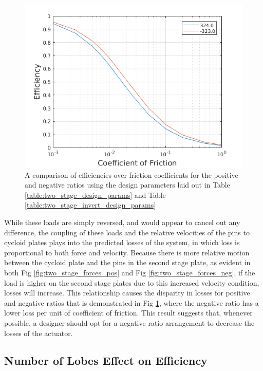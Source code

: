\begin{figure}[h]
	\centering
	\includegraphics[width=0.75\linewidth]{fig/two_stage_pos_neg}
   \caption{A comparison of efficiencies over friction coefficients for the positive and negative ratios using the design parameters laid out in Table \ref{table:two_stage_design_params} and Table \ref{table:two_stage_invert_design_params}}
   \label{fig:two_stage_pos_neg}
\end{figure}

While these loads are simply reversed, and would appear to cancel out any difference, the coupling of these loads and the relative velocities of the pins to cycloid plates plays into the predicted losses of the system, in which loss is proportional to both force and velocity. Because there is more relative motion between the cycloid plate and the pins in the second stage plate, as evident in both Fig \ref{fig:two_stage_forces_pos} and Fig \ref{fig:two_stage_forces_neg}, if the load is higher on the second stage plates due to this increased velocity condition, losses will increase. This relationship causes the disparity in losses for positive and negative ratios that is demonstrated in Fig \ref{fig:two_stage_pos_neg}, where the negative ratio has a lower loss per  unit of coefficient of friction. This result suggests that, whenever possible, a designer should opt for a negative ratio arrangement to decrease the losses of the actuator. 



\subsection{Number of Lobes Effect on Efficiency}\label{ch:dual:discussion:num_lobes}

